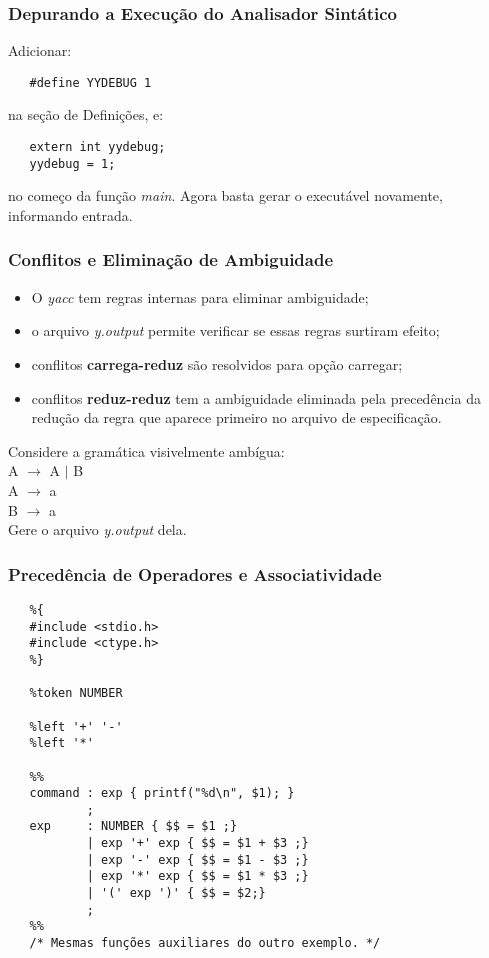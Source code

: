 \documentclass[table]{beamer}
\begin{document}
\begin{frame}[fragile]
   \frametitle{Depurando a Execução do Analisador Sintático}
   Adicionar:
   \begin{verbatim}
   #define YYDEBUG 1
   \end{verbatim}
   na seção de Definições, e:
   \begin{verbatim}
   extern int yydebug;
   yydebug = 1;
   \end{verbatim}
   no começo da função \textit{main}. Agora basta gerar o executável novamente, informando entrada. 
\end{frame}

\begin{frame}
   \frametitle{Conflitos e Eliminação de Ambiguidade}
   \begin{itemize}
      \item O \textit{yacc} tem regras internas para eliminar ambiguidade;
      \item o arquivo \textit{y.output} permite verificar se essas regras surtiram efeito;
      \item conflitos \textbf{carrega-reduz} são resolvidos para opção carregar;
      \item conflitos \textbf{reduz-reduz} tem a ambiguidade eliminada pela precedência da redução da regra que aparece primeiro no arquivo de especificação.
   \end{itemize}
   Considere a gramática visivelmente ambígua: \\
   A $\rightarrow$ A $|$ B \\
   A $\rightarrow$ a \\
   B $\rightarrow$ a \\
   Gere o arquivo \textit{y.output} dela.
\end{frame}

\begin{frame}[fragile]
   \frametitle{Precedência de Operadores e Associatividade}
   \scriptsize
   \begin{verbatim}
   %{
   #include <stdio.h>
   #include <ctype.h>
   %}

   %token NUMBER
   
   %left '+' '-'
   %left '*'

   %%
   command : exp { printf("%d\n", $1); }
           ;
   exp     : NUMBER { $$ = $1 ;}
           | exp '+' exp { $$ = $1 + $3 ;}
           | exp '-' exp { $$ = $1 - $3 ;}           
           | exp '*' exp { $$ = $1 * $3 ;}           
           | '(' exp ')' { $$ = $2;}
           ;
   %%
   /* Mesmas funções auxiliares do outro exemplo. */
   \end{verbatim}
\end{frame}
\end{document}
